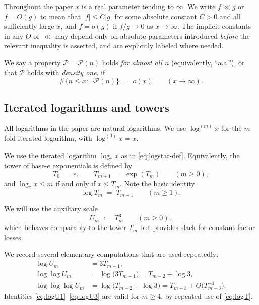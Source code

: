\documentclass[11pt,reqno]{amsart}
\theoremstyle{plain}
\theoremstyle{definition}
\newcommand{\logstar}{\log_{\!*}}
\begin{document}
Throughout the paper $x$ is a real parameter tending to $\infty$. We write $f
\ll g$ or $f=O(g)$ to mean that $|f|\le C|g|$ for some absolute constant $C>0$
and all sufficiently large $x$, and $f=o(g)$ if $f/g\to 0$ as $x\to\infty$. The
implicit constants in any $O$ or $\ll$ may depend only on absolute parameters
introduced \emph{before} the relevant inequality is asserted, and are explicitly
labeled where needed.

We say a property $\mathcal{P}=\mathcal{P}(n)$ holds \emph{for almost all $n$}
(equivalently, ``a.a.''), or that $\mathcal{P}$ holds with \emph{density one},
if
\begin{equation}\label{eq:density-one}
\#\bigl\{n\le x : \neg\mathcal{P}(n)\bigr\} \;=\; o(x)
\qquad (x\to\infty).
\end{equation}

\subsection{Iterated logarithms and towers}

All logarithms in the paper are natural logarithms. We use $\log^{(m)}x$ for
the $m$-fold iterated logarithm, with $\log^{(0)}x=x$.

We use the iterated logarithm $\logstar x$ as in \eqref{eq:logstar-def}.
Equivalently, the tower of base-$e$ exponentials is defined by
\begin{equation}\label{eq:tower}
T_0 \;=\; e, \qquad T_{m+1} \;=\; \exp(T_m) \qquad (m\ge 0),
\end{equation}
and $\logstar x\le m$ if and only if $x\le T_m$. Note the basic identity
\begin{equation}\label{eq:logT}
\log T_m \;=\; T_{m-1} \qquad (m\ge 1).
\end{equation}

We will use the auxiliary scale
\begin{equation}\label{eq:Um}
U_m \;:=\; T_m^3 \qquad (m\ge 0),
\end{equation}
which behaves comparably to the tower $T_m$ but provides slack for
constant-factor losses.

We record several elementary computations that are used repeatedly:
\begin{align}
\log U_m &= 3 T_{m-1}, \label{eq:logU1}\\
\log\log U_m &= \log\bigl(3T_{m-1}\bigr) = T_{m-2} + \log 3, \label{eq:logU2}\\
\log\log\log U_m &= \log\bigl(T_{m-2}+\log 3\bigr) = T_{m-3} + O\bigl(T_{m-3}^{-1}\bigr).\label{eq:logU3}
\end{align}
Identities \eqref{eq:logU1}--\eqref{eq:logU3} are valid for $m\ge 4$, by repeated use of \eqref{eq:logT}.
\end{document}
